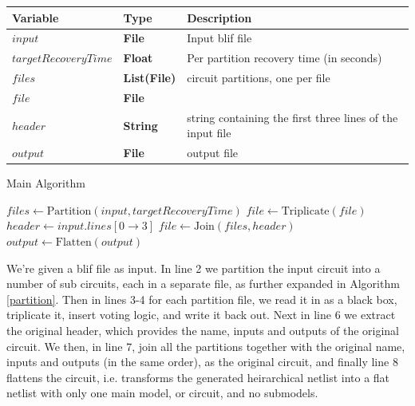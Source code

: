 \documentclass[12pt,final,oneside]{dwThesis} %
\begin{document}
   \begin{algorithm}
      \begin{center}
         \begin{tabular}{lll}
            \toprule
            Variable & Type & Description\\
            \midrule
            $input$ & \textbf{File} &  Input blif file\\
            $targetRecoveryTime$ & \textbf{ Float} &  Per partition recovery time (in seconds) \\
            $files$ & \textbf{List(File)} &  circuit partitions, one per file \\
            $file$ & \textbf{File} &  \\
            $header$ & \textbf{ String} &  string containing the first three lines of the input file \\
            $output$ & \textbf{File} &  output file\\
            \bottomrule
         \end{tabular}
      \end{center}
      \caption{Main Algorithm}\label{main}
      \begin{algorithmic}[1]
         \State $files \gets \mbox{Partition}(input, targetRecoveryTime)$
         \State $file \gets \mbox{Triplicate}(file)$
         \EndFor
         \State $header \gets input.lines[0\to 3]$
         \State $file \gets \mbox{Join}(files, header)$
         \State $output \gets \mbox{Flatten}(output)$
         \EndProcedure
      \end{algorithmic}
   \end{algorithm}
   We're given a blif file as input.
   In line 2 we partition the input circuit into a number of sub circuits, each in a separate file, as further expanded in Algorithm \ref{partition}.
   Then in lines 3-4 for each partition file, we read it in as a black box, triplicate it, insert voting logic, and write it back out.
   Next in line 6 we extract the original header, which provides the name, inputs and outputs of the original circuit.
   We then, in line 7, join all the partitions together with the original name, inputs and outputs (in the same order), as the original circuit, and finally line 8 flattens the circuit, i.e. transforms the generated heirarchical netlist into a flat netlist with only one main model, or circuit, and no submodels.

   \newpage
\end{document}
